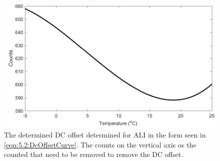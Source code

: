 \begin{figure}
    \includegraphics[width=1.0\textwidth]{./Images/5-2-DcOffset.pdf}
    \caption[Determined ALI DC Offset]{The determined DC offset determined for ALI in the form seen in \autoref{eqn:5.2:DcOffsetCurve}. The counts on the vertical axis os the counted that need to be removed to remove the DC offset.}
    \label{fig:5.2:dcOffsetCurve}
\end{figure}

